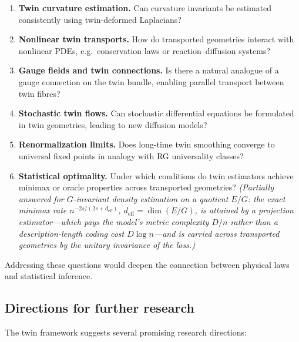 \documentclass[11pt]{article}
\theoremstyle{definition}
\begin{document}
\begin{enumerate}[itemsep=3pt]
	\item \textbf{Twin curvature estimation.}  
	Can curvature invariants be estimated consistently using twin-deformed Laplacians?
	
	\item \textbf{Nonlinear twin transports.}  
	How do transported geometries interact with nonlinear PDEs, e.g.\ conservation laws or reaction–diffusion systems?
	
	\item \textbf{Gauge fields and twin connections.}  
	Is there a natural analogue of a gauge connection on the twin bundle, enabling parallel transport between twin fibres?
	
	\item \textbf{Stochastic twin flows.}  
	Can stochastic differential equations be formulated in twin geometries, leading to new diffusion models?
	
	\item \textbf{Renormalization limits.}  
	Does long-time twin smoothing converge to universal fixed points in analogy with RG universality classes?
	
	\item \textbf{Statistical optimality.}
	Under which conditions do twin estimators achieve minimax or oracle properties across transported geometries? \emph{(Partially answered for $G$-invariant density estimation on a quotient $E/G$: the exact minimax rate $n^{-2s/(2s+d_{\mathrm{eff}})}$, $d_{\mathrm{eff}}=\dim(E/G)$, is attained by a projection estimator---which pays the model's metric complexity $D/n$ rather than a description-length coding cost $D\log n$---and is carried across transported geometries by the unitary invariance of the loss.)}
\end{enumerate}

Addressing these questions would deepen the connection between physical laws and statistical inference.

\subsection*{Directions for further research}

The twin framework suggests several promising research directions:
\end{document}
